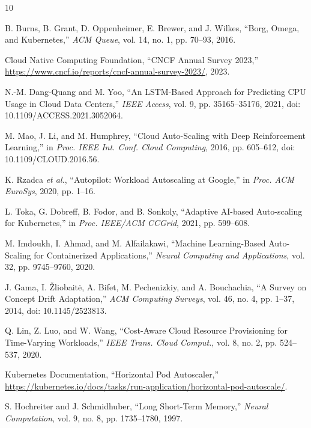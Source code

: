 \documentclass[journal]{IEEEtran}
\begin{document}
\begin{thebibliography}{10}

B. Burns, B. Grant, D. Oppenheimer, E. Brewer, and J. Wilkes, ``Borg, Omega, and Kubernetes,'' \textit{ACM Queue}, vol. 14, no. 1, pp. 70--93, 2016.

Cloud Native Computing Foundation, ``CNCF Annual Survey 2023,'' \url{https://www.cncf.io/reports/cncf-annual-survey-2023/}, 2023.

N.-M. Dang-Quang and M. Yoo, ``An LSTM-Based Approach for Predicting CPU Usage in Cloud Data Centers,'' \textit{IEEE Access}, vol. 9, pp. 35165--35176, 2021, doi: 10.1109/ACCESS.2021.3052064.

M. Mao, J. Li, and M. Humphrey, ``Cloud Auto-Scaling with Deep Reinforcement Learning,'' in \textit{Proc. IEEE Int. Conf. Cloud Computing}, 2016, pp. 605--612, doi: 10.1109/CLOUD.2016.56.

K. Rzadca \textit{et al.}, ``Autopilot: Workload Autoscaling at Google,'' in \textit{Proc. ACM EuroSys}, 2020, pp. 1--16.

L. Toka, G. Dobreff, B. Fodor, and B. Sonkoly, ``Adaptive AI-based Auto-scaling for Kubernetes,'' in \textit{Proc. IEEE/ACM CCGrid}, 2021, pp. 599--608.

M. Imdoukh, I. Ahmad, and M. Alfailakawi, ``Machine Learning-Based Auto-Scaling for Containerized Applications,'' \textit{Neural Computing and Applications}, vol. 32, pp. 9745--9760, 2020.

J. Gama, I. \v{Z}liobait\.{e}, A. Bifet, M. Pechenizkiy, and A. Bouchachia, ``A Survey on Concept Drift Adaptation,'' \textit{ACM Computing Surveys}, vol. 46, no. 4, pp. 1--37, 2014, doi: 10.1145/2523813.

Q. Lin, Z. Luo, and W. Wang, ``Cost-Aware Cloud Resource Provisioning for Time-Varying Workloads,'' \textit{IEEE Trans. Cloud Comput.}, vol. 8, no. 2, pp. 524--537, 2020.

Kubernetes Documentation, ``Horizontal Pod Autoscaler,'' \url{https://kubernetes.io/docs/tasks/run-application/horizontal-pod-autoscale/}.

S. Hochreiter and J. Schmidhuber, ``Long Short-Term Memory,'' \textit{Neural Computation}, vol. 9, no. 8, pp. 1735--1780, 1997.


\end{thebibliography}
\end{document}
